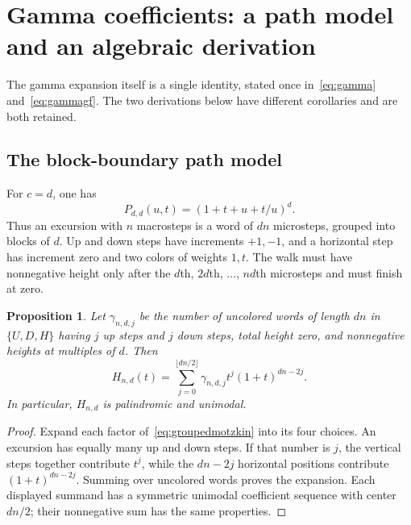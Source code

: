 \documentclass[11pt]{article}
\numberwithin{equation}{section}
\newtheorem{proposition}[theorem]{Proposition}
\theoremstyle{definition}
\begin{document}
\section{Gamma coefficients: a path model and an algebraic derivation}
\label{sec:gamma}

The gamma expansion itself is a single identity, stated once
in~\eqref{eq:gamma} and~\eqref{eq:gammagf}. The two derivations below have
different corollaries and are both retained.

\subsection{The block-boundary path model}
\label{sec:gammapath}
For $c=d$, one has
\begin{equation}
 P_{d,d}(u,t)=(1+t+u+t/u)^d.\label{eq:groupedmotzkin}
\end{equation}
Thus an excursion with $n$ macrosteps is a word of $dn$ microsteps, grouped
into blocks of $d$. Up and down steps have increments $+1,-1$, and a
horizontal step has increment zero and two colors of weights $1,t$.
The walk must have nonnegative height only after the $d$th, $2d$th,
$\ldots$, $nd$th microsteps and must finish at zero.

\begin{proposition}
\label{prop:gamma}
Let $\gamma_{n,d,j}$ be the number of uncolored words of length $dn$ in
$\{U,D,H\}$ having $j$ up steps and $j$ down steps, total height zero,
and nonnegative heights at multiples of $d$. Then
\begin{equation}
 H_{n,d}(t)=\sum_{j=0}^{\lfloor dn/2\rfloor}
                    \gamma_{n,d,j}t^j(1+t)^{dn-2j}.
 \label{eq:gamma}
\end{equation}
In particular, $H_{n,d}$ is palindromic and unimodal.
\end{proposition}
\begin{proof}
Expand each factor of~\eqref{eq:groupedmotzkin} into its four choices.
An excursion has equally many up and down steps. If that number is $j$, the
vertical steps together contribute $t^j$, while the $dn-2j$ horizontal
positions contribute $(1+t)^{dn-2j}$. Summing over uncolored words proves
the expansion. Each displayed summand has a symmetric unimodal coefficient
sequence with center $dn/2$; their nonnegative sum has the same properties.
\end{proof}
\end{document}
